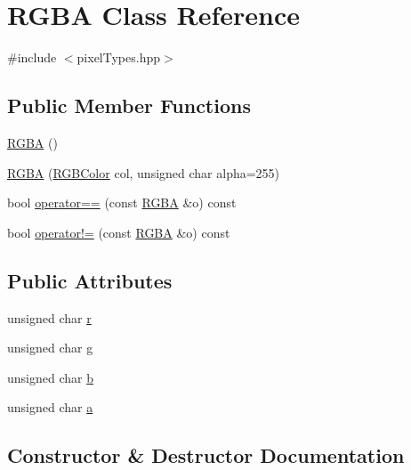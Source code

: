 \hypertarget{classRGBA}{}\section{R\+G\+B\+A Class Reference}
\label{classRGBA}


{\ttfamily \#include $<$pixel\+Types.\+hpp$>$}

\subsection*{Public Member Functions}
\begin{DoxyCompactItemize}
\item 
\hyperlink{classRGBA_a6b912f8f22796cb64355cb52fde57a03}{R\+G\+B\+A} ()
\item 
\hyperlink{classRGBA_ac8eafaf2c73cdf2c606bf26b4de8c880}{R\+G\+B\+A} (\hyperlink{pixelTypes_8hpp_a0bffee690fce7a74e4191ec31022d33b}{R\+G\+B\+Color} col, unsigned char alpha=255)
\item 
bool \hyperlink{classRGBA_ac85b0d4fa8bc306768c14207a95887d6}{operator==} (const \hyperlink{classRGBA}{R\+G\+B\+A} \&o) const 
\item 
bool \hyperlink{classRGBA_a50ad467d42074b90c39e531554721f8f}{operator!=} (const \hyperlink{classRGBA}{R\+G\+B\+A} \&o) const 
\end{DoxyCompactItemize}
\subsection*{Public Attributes}
\begin{DoxyCompactItemize}
\item 
unsigned char \hyperlink{classRGBA_af557a869b3d50a50fab6d1f8ecb0ad4b}{r}
\item 
unsigned char \hyperlink{classRGBA_a8004a0599db7d2142ddfc06368df39c7}{g}
\item 
unsigned char \hyperlink{classRGBA_a122b3a3e11b20e7fb0dc3bd45c877b0d}{b}
\item 
unsigned char \hyperlink{classRGBA_a6f5c0a3907d077f8bf0965f482fe8662}{a}
\end{DoxyCompactItemize}


\subsection{Constructor \& Destructor Documentation}
\hypertarget{classRGBA_a6b912f8f22796cb64355cb52fde57a03}{}
